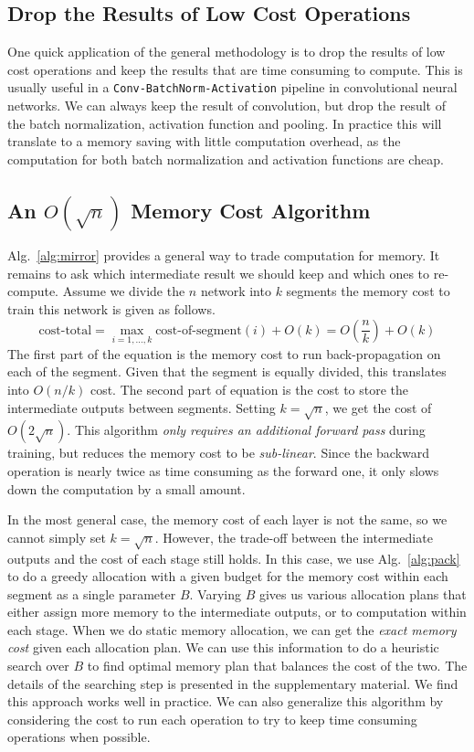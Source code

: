 \documentclass{article} %
\begin{document}
\subsection{Drop the Results of Low Cost Operations}
One quick application of the general methodology is to drop the results of low cost operations and keep the results that are time consuming to compute.
This is usually useful in a \texttt{Conv-BatchNorm-Activation} pipeline in convolutional neural
networks. We can always keep the result of convolution, but drop the result of the batch
normalization, activation function and pooling. In practice this will translate to a memory saving
with little computation overhead, as the computation for both batch normalization and activation
functions are cheap.

\subsection{An $O(\sqrt{n})$ Memory Cost Algorithm}
Alg.~\ref{alg:mirror} provides a general way to trade computation for memory.
It remains to ask which intermediate result we should keep and which ones to re-compute.
Assume we divide the $n$ network into $k$ segments the memory cost to train this network is given as follows.
\begin{equation}
   \mbox{cost-total} =  \max_{i=1,\ldots,k} \mbox{cost-of-segment}(i) + O(k) = O\left(\frac{n}
   {k}\right) + O(k)
\end{equation}
The first part of the equation is the memory cost to run back-propagation on each of the segment.
Given that the segment is equally divided, this translates into $O(n/k)$ cost.
The second part of equation is the cost to store the intermediate outputs between segments.
Setting $k =\sqrt{n}$, we get the cost of $O( 2 \sqrt{n} )$.
This algorithm \emph{only requires an additional forward pass} during training,
but reduces the memory cost to be \emph{sub-linear}.
Since the backward operation is nearly twice as time consuming as the forward one, it only slows down the
computation by a small amount.

In the most general case, the memory cost of each layer is not the same, so we cannot simply
set $k =\sqrt{n}$. However, the trade-off between the intermediate outputs and the cost of each
stage still holds.  In this case, we use Alg.~\ref{alg:pack} to do a greedy allocation with a given
budget for the memory cost within each segment as a single parameter $B$.
Varying $B$ gives us various allocation plans that either assign more memory to the intermediate
outputs, or to computation within each stage.
When we do static memory allocation, we can get the \emph{exact memory cost} given each allocation plan.
We can use this information to do a heuristic search over $B$ to find optimal memory plan that balances the cost of the two.
The details of the searching step is presented in the supplementary material.
We find this approach works well in practice.
We can also generalize this algorithm by considering the cost to run each operation to try to keep time consuming operations when possible.
\end{document}
